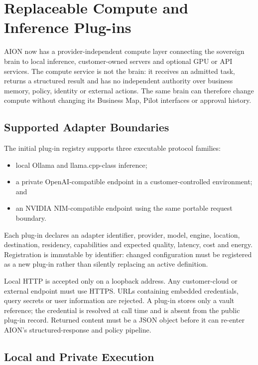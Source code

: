 \section{Replaceable Compute and Inference Plug-ins}
\label{sec:compute-plugins}

AION now has a provider-independent compute layer connecting the sovereign brain to
local inference, customer-owned servers and optional GPU or API services.  The compute
service is not the brain: it receives an admitted task, returns a structured result and
has no independent authority over business memory, policy, identity or external actions.
The same brain can therefore change compute without changing its Business Map, Pilot
interfaces or approval history.

\subsection{Supported Adapter Boundaries}

The initial plug-in registry supports three executable protocol families:
\begin{itemize}
  \item local Ollama and llama.cpp-class inference;
  \item a private OpenAI-compatible endpoint in a customer-controlled environment; and
  \item an NVIDIA NIM-compatible endpoint using the same portable request boundary.
\end{itemize}

Each plug-in declares an adapter identifier, provider, model, engine, location,
destination, residency, capabilities and expected quality, latency, cost and energy.
Registration is immutable by identifier: changed configuration must be registered as a
new plug-in rather than silently replacing an active definition.

Local HTTP is accepted only on a loopback address.  Any customer-cloud or external
endpoint must use HTTPS.  URLs containing embedded credentials, query secrets or user
information are rejected.  A plug-in stores only a vault reference; the credential is
resolved at call time and is absent from the public plug-in record.  Returned content must
be a JSON object before it can re-enter AION's structured-response and policy pipeline.

\subsection{Local and Private Execution}

